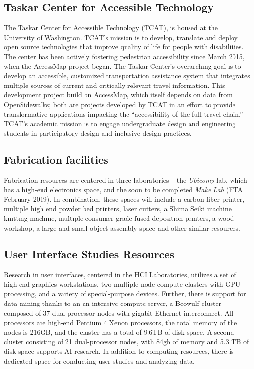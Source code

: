 
\subsection{Taskar Center for Accessible Technology}

The Taskar Center for Accessible Technology (TCAT), is housed at the University of Washington. TCAT's mission is to develop, translate and deploy open source technologies that improve quality of life for people with disabilities. The center has been actively fostering pedestrian accessibility since March 2015, when the AccessMap project began.
The Taskar Center’s overarching goal is  to develop an accessible, customized transportation assistance system that integrates multiple sources of current and critically relevant travel information. 
This development project build on AccessMap, which itself depends on data from OpenSidewalks; both are projects developed by TCAT in an effort to provide transformative applications impacting the “accessibility of the full travel chain.” TCAT's academic mission is to engage undergraduate design and engineering students in participatory design and inclusive design practices. 

\subsection{Fabrication facilities}
Fabrication resources are centered in three laboratories – the \textit{Ubicomp} lab, which has a high-end electronics space, and the soon to be completed \textit{Make Lab }(ETA February 2019). In combination, these spaces will include a carbon fiber printer, multiple high end powder bed printers, laser cutters, a Shima Seiki machine knitting machine, multiple consumer-grade fused deposition printers, a wood workshop, a large and small object assembly space and other similar resources.   

\subsection{User Interface Studies Resources} 
Research in user interfaces, centered in the HCI Laboratories, utilizes a set of high-end graphics workstations, two multiple-node compute clusters with GPU processing, and a variety of special-purpose devices. Further, there is support for data mining thanks to an an intensive compute server, a Beowulf cluster composed of 37 dual processor nodes with gigabit Ethernet interconnect. All processors are high-end Pentium 4 Xenon processors, the total memory of the nodes is 216GB, and the cluster has a total of 9.6TB of disk space. A second cluster consisting of 21 dual-processor nodes, with 84gb of memory and 5.3 TB of disk space supports AI research. In addition to computing resources, there is dedicated space for conducting user studies and analyzing data. 

